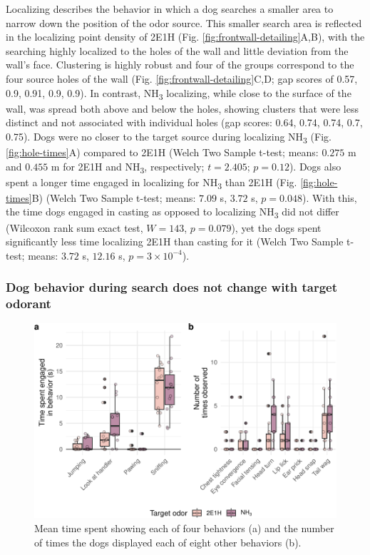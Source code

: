 \documentclass[
]{article}
\begin{document}
Localizing describes the behavior in which a dog searches a smaller area to narrow down the position of the odor source. This smaller search area is reflected in the localizing point density of 2E1H (Fig. \ref{fig:frontwall-detailing}A,B), with the searching highly localized to the holes of the wall and little deviation from the wall's face. Clustering is highly robust and four of the groups correspond to the four source holes of the wall (Fig. \ref{fig:frontwall-detailing}C,D; gap scores of 0.57, 0.9, 0.91, 0.9, 0.9). In contrast, NH\textsubscript{3} localizing, while close to the surface of the wall, was spread both above and below the holes, showing clusters that were less distinct and not associated with individual holes (gap scores: 0.64, 0.74, 0.74, 0.7, 0.75). Dogs were no closer to the target source during localizing NH\textsubscript{3} (Fig. \ref{fig:hole-times}A) compared to 2E1H (Welch Two Sample t-test; means: \(0.275\) m and \(0.455\) m for 2E1H and NH\textsubscript{3}, respectively; \(t = 2.405\); \(p = 0.12\)). Dogs also spent a longer time engaged in localizing for NH\textsubscript{3} than 2E1H (Fig. \ref{fig:hole-times}B) (Welch Two Sample t-test; means: \(7.09\) s, \(3.72\) s, \(p = 0.048\)). With this, the time dogs engaged in casting as opposed to localizing NH\textsubscript{3} did not differ (Wilcoxon rank sum exact test, \(W = 143\), \(p = 0.079\)), yet the dogs spent significantly less time localizing 2E1H than casting for it (Welch Two Sample t-test; means: \(3.72\) s, \(12.16\) s, \(p = \ensuremath{3\times 10^{-4}}\)).

\hypertarget{dog-behavior-during-search-does-not-change-with-target-odorant}{%
\subsubsection{Dog behavior during search does not change with target odorant}\label{dog-behavior-during-search-does-not-change-with-target-odorant}}

\begin{figure}
\centering
\includegraphics{main-manuscript_files/figure-latex/indiv-behavior-times-1.pdf}
\caption{\label{fig:indiv-behavior-times}Mean time spent showing each of four behaviors (a) and the number of times the dogs displayed each of eight other behaviors (b).}
\end{figure}
\end{document}
